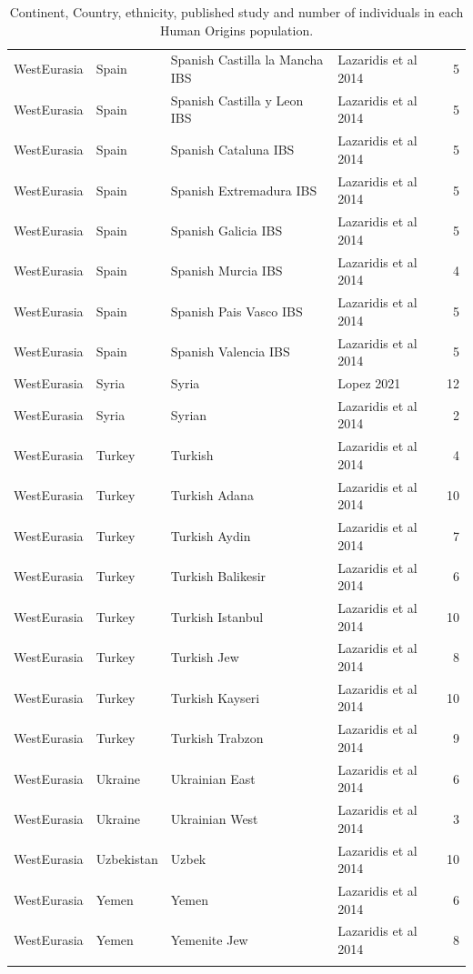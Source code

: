 \begin{longtable}[t]{lll>{\raggedright\arraybackslash}p{9em}r}
\addlinespace
WestEurasia & Spain & Spanish Castilla la Mancha IBS & Lazaridis et al 2014 & 5\\
WestEurasia & Spain & Spanish Castilla y Leon IBS & Lazaridis et al 2014 & 5\\
WestEurasia & Spain & Spanish Cataluna IBS & Lazaridis et al 2014 & 5\\
WestEurasia & Spain & Spanish Extremadura IBS & Lazaridis et al 2014 & 5\\
WestEurasia & Spain & Spanish Galicia IBS & Lazaridis et al 2014 & 5\\
\addlinespace
WestEurasia & Spain & Spanish Murcia IBS & Lazaridis et al 2014 & 4\\
WestEurasia & Spain & Spanish Pais Vasco IBS & Lazaridis et al 2014 & 5\\
WestEurasia & Spain & Spanish Valencia IBS & Lazaridis et al 2014 & 5\\
WestEurasia & Syria & Syria & Lopez 2021 & 12\\
WestEurasia & Syria & Syrian & Lazaridis et al 2014 & 2\\
\addlinespace
WestEurasia & Turkey & Turkish & Lazaridis et al 2014 & 4\\
WestEurasia & Turkey & Turkish Adana & Lazaridis et al 2014 & 10\\
WestEurasia & Turkey & Turkish Aydin & Lazaridis et al 2014 & 7\\
WestEurasia & Turkey & Turkish Balikesir & Lazaridis et al 2014 & 6\\
WestEurasia & Turkey & Turkish Istanbul & Lazaridis et al 2014 & 10\\
\addlinespace
WestEurasia & Turkey & Turkish Jew & Lazaridis et al 2014 & 8\\
WestEurasia & Turkey & Turkish Kayseri & Lazaridis et al 2014 & 10\\
WestEurasia & Turkey & Turkish Trabzon & Lazaridis et al 2014 & 9\\
WestEurasia & Ukraine & Ukrainian East & Lazaridis et al 2014 & 6\\
WestEurasia & Ukraine & Ukrainian West & Lazaridis et al 2014 & 3\\
\addlinespace
WestEurasia & Uzbekistan & Uzbek & Lazaridis et al 2014 & 10\\
WestEurasia & Yemen & Yemen & Lazaridis et al 2014 & 6\\
WestEurasia & Yemen & Yemenite Jew & Lazaridis et al 2014 & 8\\
\bottomrule
\caption{Continent, Country, ethnicity, published study and number of individuals in each Human Origins population. }
\end{longtable}
\endgroup{}




